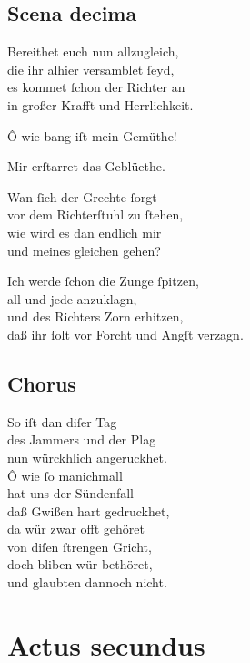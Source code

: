 \documentclass{ees}
\newenvironment{lyrics}[1]{%
  \subsection{#1}\nopagebreak%
  \begin{lyricslist}%
  \let\voice\item%
}{%
  \end{lyricslist}%
}
\begin{document}
\begin{lyrics}{Scena decima}
  \voice[St: Michael]
  Bereithet euch nun allzugleich,\\
  die ihr alhier versamblet ſeyd,\\
  es kommet ſchon der Richter an\\
  in großer Krafft und Herrlichkeit.

  \voice[St: Magdalena]
  Ô wie bang iſt mein Gemüthe!

  \voice[St: Petrus]
  Mir erſtarret das Geblüethe.

  \voice[Judas]
  Wan ſich der Grechte ſorgt\\
  vor dem Richterſtuhl zu ſtehen,\\
  wie wird es dan endlich mir\\
  und meines gleichen gehen?

  \voice[Lucifer]
  Ich werde ſchon die Zunge ſpitzen,\\
  all und jede anzuklagn,\\
  und des Richters Zorn erhitzen,\\
  daß ihr ſolt vor Forcht und Angſt verzagn.
\end{lyrics}

\begin{lyrics}{Chorus}
  \voice[Chorus]
  So iſt dan diſer Tag\\
  des Jammers und der Plag\\
  nun würckhlich angeruckhet.\\
  Ô wie ſo manichmall\\
  hat uns der Sündenfall\\
  daß Gwißen hart gedruckhet,\\
  da wür zwar offt gehöret\\
  von diſen ſtrengen Gricht,\\
  doch bliben wür bethöret,\\
  und glaubten dannoch nicht.
\end{lyrics}

\clearpage
\section{Actus secundus}
\end{document}
